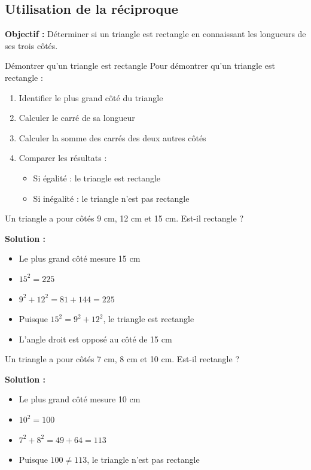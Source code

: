 \subsection{Utilisation de la réciproque}

\textbf{Objectif :} Déterminer si un triangle est rectangle en connaissant les longueurs de ses trois côtés.

\begin{methodebox}{Démontrer qu'un triangle est rectangle}
Pour démontrer qu'un triangle est rectangle :
\begin{enumerate}
    \item Identifier le plus grand côté du triangle
    \item Calculer le carré de sa longueur
    \item Calculer la somme des carrés des deux autres côtés
    \item Comparer les résultats :
    \begin{itemize}
        \item Si égalité : le triangle est rectangle
        \item Si inégalité : le triangle n'est pas rectangle
    \end{itemize}
\end{enumerate}
\end{methodebox}

\begin{examplebox}
Un triangle a pour côtés 9 cm, 12 cm et 15 cm. Est-il rectangle ?

\textbf{Solution :}
\begin{itemize}
    \item Le plus grand côté mesure 15 cm
    \item $15^2 = 225$
    \item $9^2 + 12^2 = 81 + 144 = 225$
    \item Puisque $15^2 = 9^2 + 12^2$, le triangle est rectangle
    \item L'angle droit est opposé au côté de 15 cm
\end{itemize}
\end{examplebox}

\begin{examplebox}
Un triangle a pour côtés 7 cm, 8 cm et 10 cm. Est-il rectangle ?

\textbf{Solution :}
\begin{itemize}
    \item Le plus grand côté mesure 10 cm
    \item $10^2 = 100$
    \item $7^2 + 8^2 = 49 + 64 = 113$
    \item Puisque $100 \neq 113$, le triangle n'est pas rectangle
\end{itemize}
\end{examplebox}

